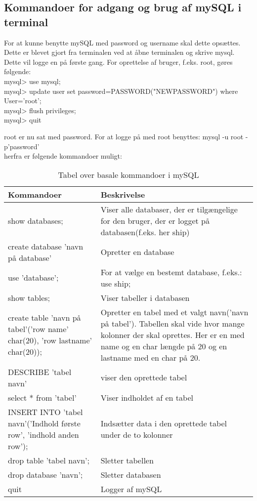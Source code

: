 \subsection*{Kommandoer for adgang og brug af mySQL i terminal}
For at kunne benytte mySQL med password og username skal dette opsættes. Dette er blevet gjort fra terminalen ved at åbne terminalen og skrive mysql. Dette vil logge en på første gang. For oprettelse af bruger, f.eks. root, gøres følgende:\\
mysql> use mysql;\\
mysql> update user set password=PASSWORD("NEWPASSWORD") where User='root';\\
mysql> flush privileges;\\
mysql> quit

root er nu sat med password. For at logge på med root benyttes:
mysql -u root -p'password'\\
herfra er følgende kommandoer muligt:
\begin{table}[H]
\begin{tabular}{|p{5cm}|p{10cm}|} \hline
\cellcolor[gray]{0.85}Kommandoer& \cellcolor[gray]{0.85}Beskrivelse  \\ \hline
show databases; & Viser alle databaser, der er tilgængelige for den bruger, der er logget på databasen(f.eks. her ship)   \\ \hline
create database 'navn på database' & Opretter en database   \\ \hline
use 'database'; & For at vælge en bestemt database, f.eks.: use ship;    \\ \hline
show tables; & Viser tabeller i databasen   \\ \hline
create table 'navn på tabel'('row name' char(20), 'row lastname' char(20));  & Opretter en tabel med et valgt navn('navn på tabel'). Tabellen skal vide hvor mange kolonner der skal oprettes. Her er en med name og en char længde på 20 og en lastname med en char på 20.  \\ \hline
DESCRIBE 'tabel navn' & viser den oprettede tabel   \\ \hline
select * from 'tabel' & Viser indholdet af en tabel   \\ \hline
INSERT INTO 'tabel navn'('Indhold første row', 'indhold anden row');  & Indsætter data i den oprettede tabel under de to kolonner   \\ \hline
drop table 'tabel navn'; & Sletter tabellen\\ \hline
drop database 'navn'; & Sletter databasen\\ \hline
quit & Logger af mySQL\\ \hline
\end{tabular}
\caption{Tabel over basale kommandoer i mySQL}
\label{table:mysqlKommandoer}
\end{table}

